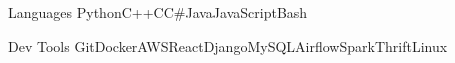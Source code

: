 \begin{siderules}


\begin{cvskills}


\cvskill
{Languages} %
{Python{\enskip\cdotp\enskip}C++{\enskip\cdotp\enskip}C{\enskip\cdotp\enskip}C\#{\enskip\cdotp\enskip}Java{\enskip\cdotp\enskip}JavaScript{\enskip\cdotp\enskip}Bash} %


\cvskill
{Dev Tools} 
{Git{\enskip\cdotp\enskip}Docker{\enskip\cdotp\enskip}AWS{\enskip\cdotp\enskip}React{\enskip\cdotp\enskip}Django{\enskip\cdotp\enskip}MySQL{\enskip\cdotp\enskip}Airflow{\enskip\cdotp\enskip}Spark{\enskip\cdotp\enskip}Thrift{\enskip\cdotp\enskip}Linux} 





\end{cvskills}
\end{siderules}